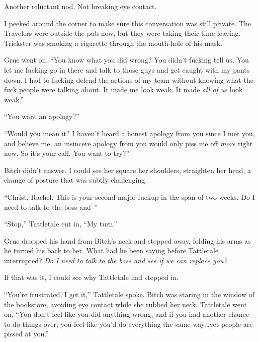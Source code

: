 Another reluctant nod.  Not breaking eye contact.



I peeked around the corner to make sure this conversation was still private.  The Travelers were outside the pub now, but they were taking their time leaving.  Trickster was smoking a cigarette through the mouth-hole of his mask.



Grue went on, ``You know what you did wrong?  You didn't fucking tell us.  You let me fucking go in there and talk to those guys and get caught with my pants down.  I had to fucking defend the actions of my team without knowing what the fuck people were talking about.  It made me look weak.  It made \emph{all of us} look weak.''



``You want an apology?''



``Would you mean it?  I haven't heard a honest apology from you since I met you, and believe me, an insincere apology from you would only piss me off \emph{more }right now.  So it's your call.  You want to try?''



Bitch didn't answer.  I could see her square her shoulders, straighten her head, a change of posture that was subtly challenging.



``Christ, Rachel.  This is your second major fuckup in the span of two weeks.  Do I need to talk to the boss and--''



``Stop,'' Tattletale cut in, ``My turn.''



Grue dropped his hand from Bitch's neck and stepped away, folding his arms as he turned his back to her.  What had he been saying before Tattletale interrupted?  \emph{Do I need to talk to the boss and see if we can replace you?}



If that was it, I could see why Tattletale had stepped in.



``You're frustrated, I get it,'' Tattletale spoke.  Bitch was staring in the window of the bookstore, avoiding eye contact while she rubbed her neck.  Tattletale went on, ``You don't feel like you did anything wrong, and if you had another chance to do things over, you feel like you'd do everything the same way\ldots yet people are pissed at you.''



